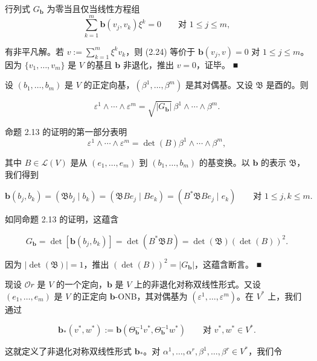 \begin{remark}
\begin{items}
\proofhead
行列式 $ G_{\mathbf{b}} $ 为零当且仅当线性方程组
\begin{equation}
\sum_{k=1}^{m} \mathbf{b}(v_j, v_k)\xi^k = 0 \qquad \text{对 } 1 \le j \le m ,\tag{2.24}
\end{equation}

有非平凡解。若 $ v := \sum_{k=1}^{m} \xi^k v_k $，则 (2.24) 等价于 $ \mathbf{b}(v_j, v) = 0 $ 对 $ 1 \le j \le m $。因为 $ \{v_1, \ldots, v_m\} $ 是 $ V $ 的基且 $ \mathbf{b} $ 非退化，推出 $ v = 0 $，证毕。 \nobreak\hspace{0.35em}■

\item

设 $ (b_1, \ldots, b_m) $ 是 $ V $ 的正定向基，$ (\beta^1, \ldots, \beta^m) $ 是其对偶基。又设 $ \mathfrak{B} $ 是酉的。则

\[
\varepsilon^1 \wedge \cdots \wedge \varepsilon^m = \sqrt{|G_{\mathbf{b}}|}\, \beta^1 \wedge \cdots \wedge \beta^m .
\]

\proofhead
命题 2.13 的证明的第一部分表明
\[
\varepsilon^1 \wedge \cdots \wedge \varepsilon^m = \det(B)\beta^1 \wedge \cdots \wedge \beta^m ,
\]

其中 $ B \in \mathcal{L}(V) $ 是从 $ (e_1, \ldots, e_m) $ 到 $ (b_1, \ldots, b_m) $ 的基变换。以 $ \mathbf{b} $ 的表示 $ \mathfrak{B} $，我们得到

\[
\mathbf{b}(b_j, b_k) = (\mathfrak{B}b_j \mid b_k) = (\mathfrak{B}Be_j \mid Be_k) = (B^*\mathfrak{B}Be_j \mid e_k) \qquad \text{对 } 1 \le j, k \le m .
\]

如同命题 2.13 的证明，这蕴含

\[
G_{\mathbf{b}} = \det[\mathbf{b}(b_j, b_k)] = \det(B^*\mathfrak{B}B) = \det(\mathfrak{B})(\det(B))^2 .
\]

因为 $ |\det(\mathfrak{B})| = 1 $，推出 $ (\det(B))^2 = |G_{\mathbf{b}}| $，这蕴含断言。 \nobreak\hspace{0.35em}■

\end{items}

现设 $ \mathcal{O}r $ 是 $ V $ 的一个定向，$ \mathbf{b} $ 是 $ V $ 上的非退化对称双线性形式。又设 $ (e_1, \ldots, e_m) $ 是 $ V $ 的正定向 $ \mathbf{b} $-ONB，其对偶基为 $ (\varepsilon^1, \ldots, \varepsilon^m) $。在 $ V^* $ 上，我们通过

\[
\mathbf{b}_*(v^*, w^*) := \mathbf{b}(\Theta_{\mathbf{b}}^{-1}v^*, \Theta_{\mathbf{b}}^{-1}w^*) \qquad \text{对 } v^*, w^* \in V^* .
\]

这就定义了非退化对称双线性形式 $ \mathbf{b}_* $。对 $ \alpha^1, \ldots, \alpha^r, \beta^1, \ldots, \beta^r \in V^* $，我们令


\end{remark}
